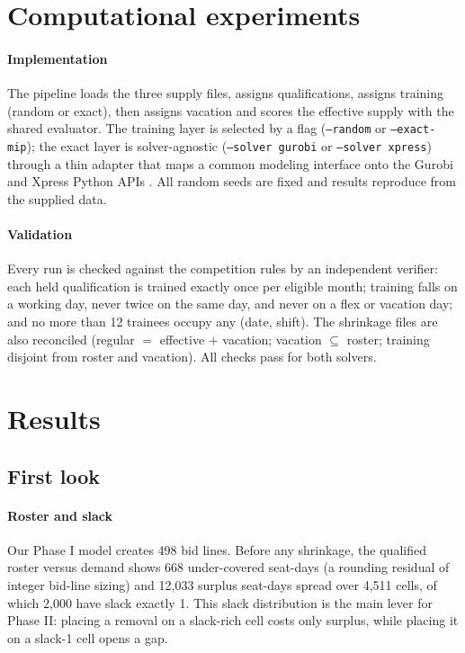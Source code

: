 \documentclass[preprint,12pt]{elsarticle}
\begin{document}
\section{Computational experiments} \label{sec:computational_experiments}
   \paragraph{Implementation} The pipeline loads the three supply files, assigns qualifications, assigns training (random or exact), then assigns vacation and scores the effective supply with the shared evaluator. The training layer is selected by a flag (\texttt{---random} or \texttt{---exact-mip}); the exact layer is solver-agnostic (\texttt{---solver gurobi} or \texttt{---solver xpress}) through a thin adapter that maps a common modeling interface onto the Gurobi and Xpress Python APIs \citep{gurobi2026,xpress2026}. All random seeds are fixed and results reproduce from the supplied data.

   \paragraph{Validation} Every run is checked against the competition rules by an independent verifier: each held qualification is trained exactly once per eligible month; training falls on a working day, never twice on the same day, and never on a flex or vacation day; and no more than 12 trainees occupy any (date, shift). The shrinkage files are also reconciled (regular $=$ effective $+$ vacation; vacation $\subseteq$ roster; training disjoint from roster and vacation). All checks pass for both solvers.

\section{Results} \label{sec:results}

   \subsection{First look}
      \paragraph{Roster and slack} Our Phase I model creates 498 bid lines. Before any shrinkage, the qualified roster versus demand shows 668 under-covered seat-days (a rounding residual of integer bid-line sizing) and 12,033 surplus seat-days spread over 4,511 cells, of which 2,000 have slack exactly 1. This slack distribution is the main lever for Phase II: placing a removal on a slack-rich cell costs only surplus, while placing it on a slack-1 cell opens a gap.
\end{document}
